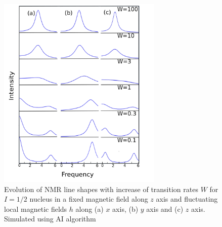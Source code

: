 \begin{figure}[h!]
\centering
\includegraphics[width=0.7\textwidth]{figures/chap2/blumediag.png}
\caption{Evolution of NMR line shapes with increase of transition rates $W$ for $I=1/2$ nucleus in a fixed magnetic field along $z$ axis and fluctuating local magnetic fields $h$ along (a) $x$ axis, (b) $y$ axis and (c) $z$ axis. Simulated using AI algorithm}
\label{figure:blumediag_new}
\end{figure}
\clearpage
